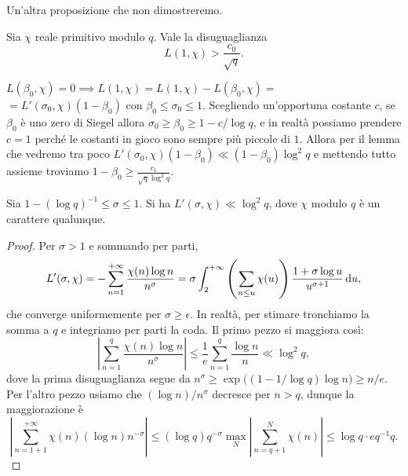 Un'altra proposizione che non dimostreremo.

\begin{prop}
  Sia $\chi$ reale primitivo modulo $q$. Vale la disuguaglianza
  $$L(1,\chi)>\frac{c_0}{\sqrt{q}}.$$
\end{prop}

\begin{oss}
  $L(\beta_0,\chi)=0 \implies L(1,\chi)=L(1,\chi)-L(\beta_0,\chi)=$\\
  $=L'(\sigma_0,\chi)(1-\beta_0)$ con $\beta_0 \le \sigma_0 \le 1$. Scegliendo un'opportuna costante $c$, se $\beta_0$ è uno zero di Siegel allora $\sigma_0 \ge \beta_0 \ge 1-c/\log{q}$, e in realtà possiamo prendere $c=1$ perché le costanti in gioco sono sempre più piccole di $1$.
  Allora per il lemma che vedremo tra poco $L'(\sigma_0,\chi)(1-\beta_0) \ll (1-\beta_0)\log^2{q}$ e mettendo tutto assieme troviamo $1-\beta_0 \ge \frac{c_1}{\sqrt{q}\log^2{q}}$.
\end{oss}

\begin{lm}
  Sia $1-(\log{q})^{-1} \le \sigma \le 1$. Si ha $L'(\sigma,\chi) \ll \log^2{q}$, dove $\chi$ modulo $q$ è un carattere qualunque.
\end{lm}

\begin{proof}
  Per $\sigma>1$ e sommando per parti,
  $$L'(\sigma,\chi)=-\sum_{n=1}^{+\infty} \frac{\chi(n)\log{n}}{n^\sigma}=\sigma\int_2^{+\infty} \left(\sum_{n \le u} \chi(u)\right) \frac{1+\sigma\log{u}}{u^{\sigma+1}}\mathop{}\!\mathrm{d} u,$$
  che converge uniformemente per $\sigma \ge \epsilon$.
  In realtà, per stimare tronchiamo la somma a $q$ e integriamo per parti la coda. Il primo pezzo si maggiora così:
  $$\left| \sum_{n=1}^q \frac{\chi(n)\log{n}}{n^{\sigma}}\right| \le \frac{1}{e}\sum_{n=1}^q \frac{\log{n}}{n} \ll \log^2{q},$$
  dove la prima disuguaglianza segue da $n^\sigma \ge \exp\big((1-1/\log{q})\log{n}\big) \ge n/e$. Per l'altro pezzo usiamo che $(\log{n})/n^{\sigma}$ decresce per $n>q$, dunque la maggiorazione è
  $$\left|\sum_{n=1+1}^{+\infty} \chi(n)(\log{n})n^{-\sigma}\right| \le (\log{q})q^{-\sigma}\max_N \left|\sum_{n=q+1}^N \chi(n)\right| \le \log{q}\cdot eq^{-1}q.$$
\end{proof}
